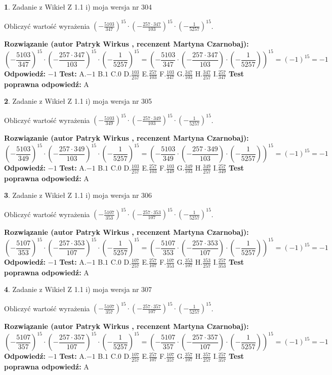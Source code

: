 \documentclass[12pt, a4paper]{article}
\theoremstyle{definition} %
\newtheorem{zad}{}
\newcommand{\zadStart}[1]{\begin{zad}#1\newline}
\newcommand{\zadStop}{\end{zad}}
\newcommand{\rozwStart}[2]{\noindent \textbf{Rozwiązanie (autor #1 , recenzent #2): }\newline}
\newcommand{\rozwStop}{\newline}
\newcommand{\odpStart}{\noindent \textbf{Odpowiedź:}\newline}
\newcommand{\odpStop}{\newline}
\newcommand{\testStart}{\noindent \textbf{Test:}\newline}
\newcommand{\testStop}{\newline}
\newcommand{\kluczStart}{\noindent \textbf{Test poprawna odpowiedź:}\newline}
\newcommand{\kluczStop}{\newline}
\begin{document}
\zadStart{Zadanie z Wikieł Z 1.1 i) moja wersja nr 304}

Obliczyć wartość wyrażenia $(-\frac{5103}{347})^{15} \cdot (-\frac{257 \cdot 347}{103})^{15} \cdot (-\frac{1}{5257})^{15}$.
\zadStop
\rozwStart{Patryk Wirkus}{Martyna Czarnobaj}
$$(-\frac{5103}{347})^{15} \cdot (-\frac{257 \cdot 347}{103})^{15} \cdot (-\frac{1}{5257})^{15} = (-\frac{5103}{347} \cdot (-\frac{257 \cdot 347}{103}) \cdot (-\frac{1}{5257}))^{15} = (-1)^{15} = -1$$
\rozwStop
\odpStart
$-1$
\odpStop
\testStart
A.$-1$ B.$1$ C.$0$ D.$\frac{103}{257}$ E.$\frac{257}{103}$
F.$\frac{103}{347}$ G.$\frac{347}{103}$
H.$\frac{347}{257}$
I.$\frac{257}{347}$
\testStop
\kluczStart
A
\kluczStop



\zadStart{Zadanie z Wikieł Z 1.1 i) moja wersja nr 305}

Obliczyć wartość wyrażenia $(-\frac{5103}{349})^{15} \cdot (-\frac{257 \cdot 349}{103})^{15} \cdot (-\frac{1}{5257})^{15}$.
\zadStop
\rozwStart{Patryk Wirkus}{Martyna Czarnobaj}
$$(-\frac{5103}{349})^{15} \cdot (-\frac{257 \cdot 349}{103})^{15} \cdot (-\frac{1}{5257})^{15} = (-\frac{5103}{349} \cdot (-\frac{257 \cdot 349}{103}) \cdot (-\frac{1}{5257}))^{15} = (-1)^{15} = -1$$
\rozwStop
\odpStart
$-1$
\odpStop
\testStart
A.$-1$ B.$1$ C.$0$ D.$\frac{103}{257}$ E.$\frac{257}{103}$
F.$\frac{103}{349}$ G.$\frac{349}{103}$
H.$\frac{349}{257}$
I.$\frac{257}{349}$
\testStop
\kluczStart
A
\kluczStop



\zadStart{Zadanie z Wikieł Z 1.1 i) moja wersja nr 306}

Obliczyć wartość wyrażenia $(-\frac{5107}{353})^{15} \cdot (-\frac{257 \cdot 353}{107})^{15} \cdot (-\frac{1}{5257})^{15}$.
\zadStop
\rozwStart{Patryk Wirkus}{Martyna Czarnobaj}
$$(-\frac{5107}{353})^{15} \cdot (-\frac{257 \cdot 353}{107})^{15} \cdot (-\frac{1}{5257})^{15} = (-\frac{5107}{353} \cdot (-\frac{257 \cdot 353}{107}) \cdot (-\frac{1}{5257}))^{15} = (-1)^{15} = -1$$
\rozwStop
\odpStart
$-1$
\odpStop
\testStart
A.$-1$ B.$1$ C.$0$ D.$\frac{107}{257}$ E.$\frac{257}{107}$
F.$\frac{107}{353}$ G.$\frac{353}{107}$
H.$\frac{353}{257}$
I.$\frac{257}{353}$
\testStop
\kluczStart
A
\kluczStop



\zadStart{Zadanie z Wikieł Z 1.1 i) moja wersja nr 307}

Obliczyć wartość wyrażenia $(-\frac{5107}{357})^{15} \cdot (-\frac{257 \cdot 357}{107})^{15} \cdot (-\frac{1}{5257})^{15}$.
\zadStop
\rozwStart{Patryk Wirkus}{Martyna Czarnobaj}
$$(-\frac{5107}{357})^{15} \cdot (-\frac{257 \cdot 357}{107})^{15} \cdot (-\frac{1}{5257})^{15} = (-\frac{5107}{357} \cdot (-\frac{257 \cdot 357}{107}) \cdot (-\frac{1}{5257}))^{15} = (-1)^{15} = -1$$
\rozwStop
\odpStart
$-1$
\odpStop
\testStart
A.$-1$ B.$1$ C.$0$ D.$\frac{107}{257}$ E.$\frac{257}{107}$
F.$\frac{107}{357}$ G.$\frac{357}{107}$
H.$\frac{357}{257}$
I.$\frac{257}{357}$
\testStop
\kluczStart
A
\kluczStop
\end{document}

